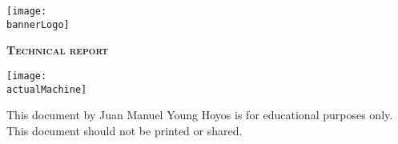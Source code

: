 \begin{titlepage}
    \centering
    \texttt{[image: \\bannerLogo]}\par\vspace{1cm}
    {\scshape\LARGE \textbf{Technical report}}\par\vspace{0.3cm}
    {\Huge \bfseries \textcolor{pinkBanner}{\productToTestName}}\par\vspace{1cm}
    \vfill
    \vfill
    \texttt{[image: \\actualMachine]}\par\vspace{1cm}
    \vfill
    \begin{tcolorbox}[colback=red!5!white,colframe=red!75!black]
        \centering
        This document by Juan Manuel Young Hoyos is for educational purposes only.\\
        This document should not be printed or shared.
    \end{tcolorbox}
    \vfill
    {\large \startDate}\par
    \vfill
    \clearpage
\end{titlepage}